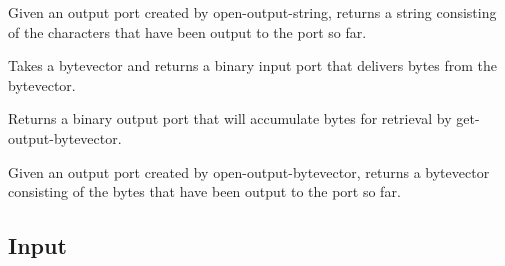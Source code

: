 \begin{entry}{%
}

Given an output port created by {\cf open-output-string}, returns a
string consisting of the characters that have been output to the port
so far.
\end{entry}



\begin{entry}{%
}

Takes a bytevector and returns a binary input port that delivers
bytes from the bytevector.


\end{entry}

\begin{entry}{%
}

Returns a binary output port that will accumulate bytes for
retrieval by {\cf get-output-bytevector}.

\end{entry}

\begin{entry}{%
}

Given an output port created by {\cf open-output-bytevector}, returns a
bytevector consisting of the bytes that have been output to the port
so far.
\end{entry}


\subsection{Input}
\label{inputsection}

